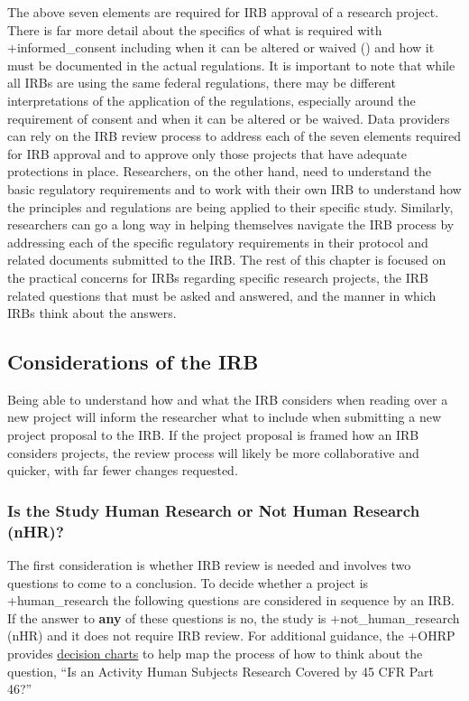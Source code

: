 \documentclass[
]{WileySix}
\begin{document}
The above seven elements are required for IRB approval of a research project. There is far more detail about the specifics of what is required with +informed\_consent\textbar{} including when it can be altered or waived (\citet{codeoffederalregulations2017a}) and how it must be documented in the actual regulations. It is important to note that while all IRBs are using the same federal regulations, there may be different interpretations of the application of the regulations, especially around the requirement of consent and when it can be altered or be waived. Data providers can rely on the IRB review process to address each of the seven elements required for IRB approval and to approve only those projects that have adequate protections in place. Researchers, on the other hand, need to understand the basic regulatory requirements and to work with their own IRB to understand how the principles and regulations are being applied to their specific study. Similarly, researchers can go a long way in helping themselves navigate the IRB process by addressing each of the specific regulatory requirements in their protocol and related documents submitted to the IRB.
The rest of this chapter is focused on the practical concerns for IRBs regarding specific research projects, the IRB related questions that must be asked and answered, and the manner in which IRBs think about the answers.

\hypertarget{considerations-of-the-irb}{%
\subsection{Considerations of the IRB}\label{considerations-of-the-irb}}

Being able to understand how and what the IRB considers when reading over a new project will inform the researcher what to include when submitting a new project proposal to the IRB. If the project proposal is framed how an IRB considers projects, the review process will likely be more collaborative and quicker, with far fewer changes requested.

\hypertarget{is-the-study-human-research-or-not-human-research-nhr}{%
\subsubsection{Is the Study Human Research or Not Human Research (nHR)?}\label{is-the-study-human-research-or-not-human-research-nhr}}

The first consideration is whether IRB review is needed and involves two questions to come to a conclusion. To decide whether a project is +human\_research\textbar{} the following questions are considered in sequence by an IRB. If the answer to \textbf{any} of these questions is no, the study is +not\_human\_research\textbar{} (nHR) and it does not require IRB review. For additional guidance, the +OHRP\textbar{} provides \href{https://www.hhs.gov/ohrp/regulations-and-policy/decision-charts/index.html}{decision charts} \citep{officeforhumanresearchprotections2020} to help map the process of how to think about the question, ``Is an Activity Human Subjects Research Covered by 45 CFR Part 46?''
\end{document}

